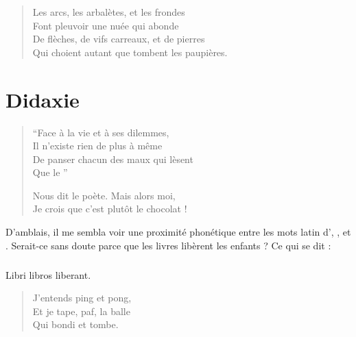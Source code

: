 \begin{verse}%
  \quatrain%
  Les arcs, les arbalètes, et les frondes\\  %
  Font pleuvoir une nuée qui abonde\\  %
  De flèches, de vifs carreaux, et de pierres\\  %
  Qui choient autant que tombent les paupières.
\end{verse}


\section*{Didaxie}

\begin{verse}%
  \quatrain\distique%
  \enquote{Face à la vie et à ses dilemmes,\\  %
  Il n’existe rien de plus à même\\  %
  De panser chacun des maux qui lèsent\\  %
  Que le }

  Nous dit le poète. Mais alors moi,\\  %
  Je crois que c’est plutôt le chocolat !
\end{verse}

\begin{prose}
D’amblais, il me sembla voir une proximité phonétique entre les mots latin d’, , et . Serait-ce sans doute parce que les livres libèrent les enfants ? Ce qui se dit :
\end{prose}

\subparagraph{}
Libri libros liberant.

\begin{verse}%
  \haiku
  J’entends ping et pong,\\  %
  Et je tape, paf, la balle\\  %
  Qui bondi et tombe.
\end{verse}

